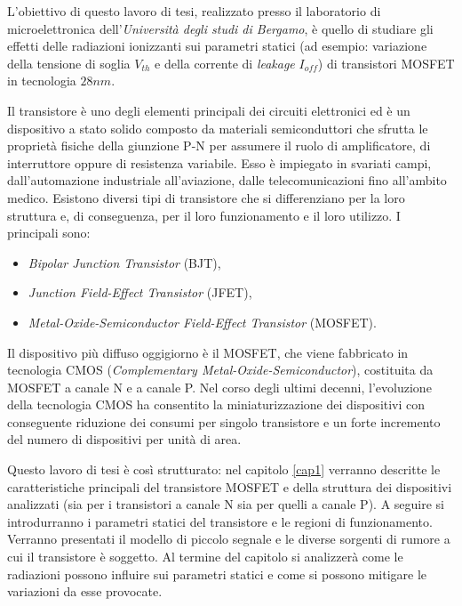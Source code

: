L'obiettivo di questo lavoro di tesi, realizzato presso il laboratorio di microelettronica dell'\textit{Università degli studi di Bergamo}, è quello di studiare gli effetti delle radiazioni ionizzanti sui parametri statici (ad esempio: variazione della tensione di soglia $V_{th}$ e della corrente di \emph{leakage} $I_{off}$) di transistori MOSFET in tecnologia $28nm$. 

\vspace*{0.5cm}

Il transistore è uno degli elementi principali dei circuiti elettronici ed è un dispositivo a stato solido composto da materiali semiconduttori che sfrutta le proprietà fisiche della giunzione P-N per assumere il ruolo di amplificatore, di interruttore oppure di resistenza variabile.
Esso è impiegato in svariati campi, dall'automazione industriale all'aviazione, dalle telecomunicazioni fino all'ambito medico.
Esistono diversi tipi di transistore che si differenziano per la loro struttura e, di conseguenza, per il loro funzionamento e il loro utilizzo. I principali sono:
\begin{itemize}
    \item \textit{Bipolar Junction Transistor} (BJT),
    \item \textit{Junction Field-Effect Transistor} (JFET),
    \item \textit{Metal-Oxide-Semiconductor Field-Effect Transistor} (MOSFET).
\end{itemize}

Il dispositivo più diffuso oggigiorno è il MOSFET, che viene fabbricato in tecnologia CMOS (\textit{Complementary Metal-Oxide-Semiconductor}), costituita da MOSFET a canale N e a canale P. Nel corso degli ultimi decenni, l'evoluzione della tecnologia CMOS ha consentito la miniaturizzazione dei dispositivi con conseguente riduzione dei consumi per singolo transistore e un forte incremento del numero di dispositivi per unità di area.

\vspace*{0.5cm}

Questo lavoro di tesi è così strutturato: nel capitolo \ref{cap1} verranno descritte le caratteristiche principali del transistore MOSFET e della struttura dei dispositivi analizzati (sia per i transistori a canale N sia per quelli a canale P). A seguire si introdurranno i parametri statici del transistore e le regioni di funzionamento. Verranno presentati il modello di piccolo segnale e le diverse sorgenti di rumore a cui il transistore è soggetto. Al termine del capitolo si analizzerà come le radiazioni possono influire sui parametri statici e come si possono mitigare le variazioni da esse provocate.

